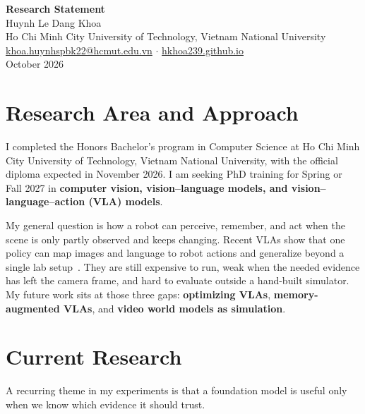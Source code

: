 \documentclass[11pt]{article}
\begin{document}
\begin{center}
    {\LARGE \textbf{Research Statement}}\\[0.35em]
    {\large Huynh Le Dang Khoa}\\[0.12em]
    Ho Chi Minh City University of Technology, Vietnam National University\\
    \href{mailto:khoa.huynhspbk22@hcmut.edu.vn}{khoa.huynhspbk22@hcmut.edu.vn}
    \quad$\cdot$\quad
    \href{https://hkhoa239.github.io/}{hkhoa239.github.io}\\[0.15em]
    {\small October 2026}
\end{center}

\section*{Research Area and Approach}

I completed the Honors Bachelor's program in Computer Science at Ho Chi Minh City University of Technology, Vietnam National University, with the official diploma expected in November 2026. I am seeking PhD training for Spring or Fall 2027 in \textbf{computer vision, vision--language models, and vision--language--action (VLA) models}.

My general question is how a robot can perceive, remember, and act when the scene is only partly observed and keeps changing. Recent VLAs show that one policy can map images and language to robot actions and generalize beyond a single lab setup~\cite{black2025pi05,bu2025univla}. They are still expensive to run, weak when the needed evidence has left the camera frame, and hard to evaluate outside a hand-built simulator. My future work sits at those three gaps: \textbf{optimizing VLAs}, \textbf{memory-augmented VLAs}, and \textbf{video world models as simulation}.

\section*{Current Research}

A recurring theme in my experiments is that a foundation model is useful only when we know which evidence it should trust.
\end{document}
